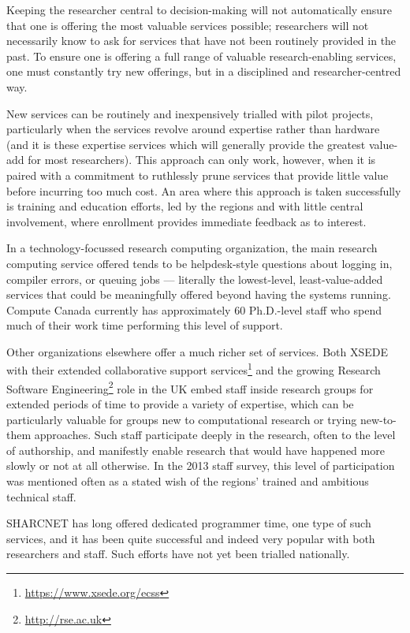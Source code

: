 \documentclass[11pt]{article}
\begin{document}
Keeping the researcher central to decision-making will not automatically
ensure that one is offering the most valuable services possible;
researchers will not necessarily know to ask for services that have
not been routinely provided in the past.  To ensure one is offering
a full range of valuable research-enabling services, one must
constantly try new offerings, but in a disciplined and researcher-centred
way.  

New services can be routinely and inexpensively trialled with
pilot projects, particularly when the services revolve around expertise
rather than hardware (and it is these expertise services which will
generally provide the greatest value-add for most researchers).  
This approach can only work, however, when it is paired with 
a commitment to ruthlessly prune services that provide little value before
incurring too much cost.  An area where this approach is taken successfully
is training and education efforts, led by the regions and with little central
involvement, where enrollment provides immediate feedback as to interest.

In a technology-focussed research computing organization, the main
research computing service offered tends to be helpdesk-style
questions about logging in, compiler errors, or queuing jobs 
--- literally the lowest-level, least-value-added services that could
be meaningfully offered beyond having the systems running.
Compute Canada currently has approximately 60 Ph.D.-level staff who
spend much of their work time performing this level of support.

Other organizations elsewhere offer a much richer set of services.
Both XSEDE with their extended collaborative support
services\footnote{\url{https://www.xsede.org/ecss}} and the growing
Research Software Engineering\footnote{\url{http://rse.ac.uk}} role
in the UK embed staff inside research groups for extended periods
of time to provide a variety of expertise, which can be particularly
valuable for groups new to computational research or trying new-to-them
approaches.  Such staff participate deeply in the research, often
to the level of authorship, and manifestly enable research that
would have happened more slowly or not at all otherwise.  In the
2013 staff survey, this level of participation was mentioned often
as a stated wish of the regions' trained and ambitious technical
staff.  

SHARCNET has long offered dedicated programmer time, one type of
such services, and it has been quite successful and indeed very
popular with both researchers and staff.  Such efforts have not yet
been trialled nationally.
\end{document}
